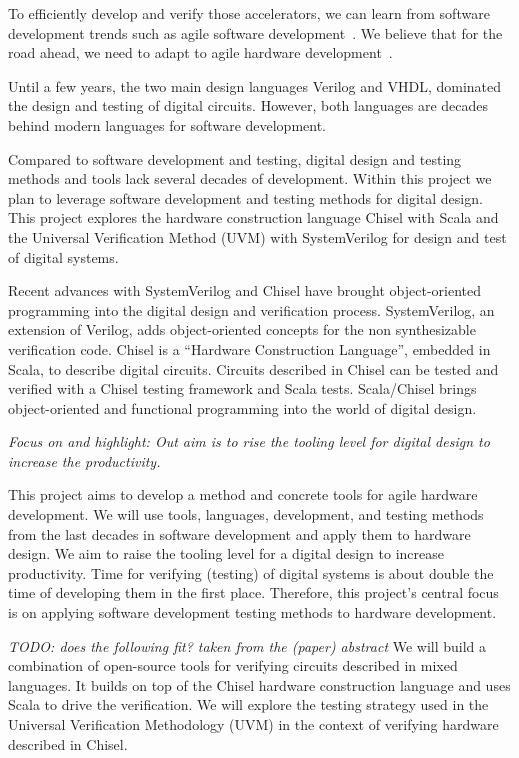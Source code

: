 \documentclass[fleqn,12pt]{article}
\newcommand{\todo}[1]{{\it TODO: #1}}
\begin{document}
To efficiently develop and verify those accelerators, we can learn from software development trends such as agile software development~\cite{agile:manifesto}.
We believe that for the road ahead, we need to adapt to agile hardware development~\cite{henn-patt:turing:2019}.

Until a few years, the two main design languages Verilog and VHDL, dominated the
design and testing of digital circuits. However, both languages are decades behind
modern languages for software development.

Compared to software development and testing, digital design and testing methods
and tools lack several decades of development. Within this project we plan to
leverage software development and testing methods for digital design.
This project explores the hardware construction language Chisel with Scala
and the Universal Verification Method (UVM) with SystemVerilog for
design and test of digital systems.

Recent advances with SystemVerilog and Chisel \cite{chisel:dac2012, chisel:book} have brought object-oriented programming
into the digital design and verification process. SystemVerilog, an extension of Verilog, adds object-oriented concepts for the non synthesizable verification code.
Chisel is a ``Hardware Construction Language'', embedded in Scala, to describe digital circuits.
Circuits described in Chisel can be tested and verified with a Chisel testing framework and Scala tests.
Scala/Chisel brings object-oriented and functional programming into the world of
digital design.


\emph{Focus on and highlight: Out aim is to rise the tooling level for digital design to increase
the productivity.}

This project aims to develop a method and concrete tools for agile hardware development.
We will use tools, languages, development, and testing methods from the last decades in
software development and apply them to hardware design.
We aim to raise the tooling level for a digital design to increase productivity.
Time for verifying (testing) of digital systems is about double the time of developing
them in the first place.
Therefore, this project's central focus is on applying software development
testing methods to hardware development.


\todo{does the following fit? taken from the (paper) abstract} 
We will build a combination of open-source tools for verifying
circuits described in mixed languages. It builds on top of the Chisel
hardware construction language and uses Scala to drive the verification. 
We will explore the testing strategy used in the Universal Verification Methodology
(UVM) in the context of verifying hardware described in Chisel.
\end{document}
